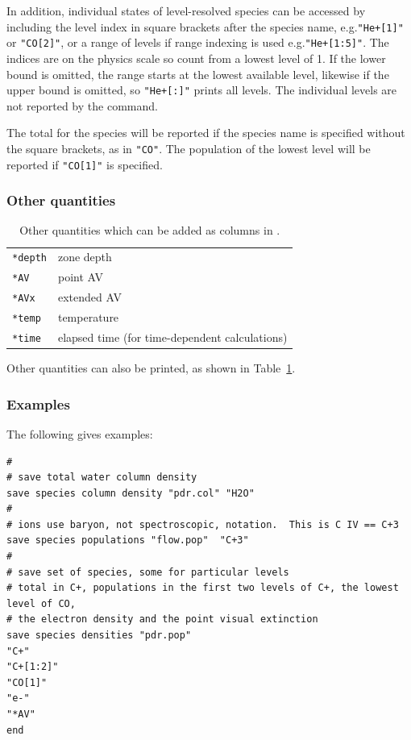 In addition, individual states of level-resolved species can be
accessed by including the level index in square brackets after the
species name, e.g.\@ \verb|"He+[1]"| or \verb|"CO[2]"|, or a range of
levels if range indexing is used e.g.\@ \verb|"He+[1:5]"|.  
The indices are on the physics scale so count from a lowest level of 1.
If the
lower bound is omitted, the range starts at the lowest available
level, likewise if the upper bound is omitted, so \verb|"He+[:]"|
prints all levels.  The individual levels are not reported by the
 command.
  
The total for the species will be reported if the species name is specified
without the square brackets, as in \verb|"CO"|.  The population of the
lowest level will be reported if  \verb|"CO[1]"| is specified.

\subsubsection{Other quantities}
\begin{table}
\caption{Other quantities which can be added as columns in \protect{}.}
\begin{center}
\begin{tabular}{ll}
\verb|*depth| & zone depth \\
\verb|*AV| & point AV \\
\verb|*AVx| & extended AV \\
\verb|*temp| & temperature \\
\verb|*time| & elapsed time (for time-dependent calculations)
\end{tabular}
\end{center}
\label{tab:othersaves}
\end{table}
Other quantities can also be printed, as shown in Table~\ref{tab:othersaves}.

\subsubsection{Examples}

The following gives examples:
\begin{verbatim}
#
# save total water column density
save species column density "pdr.col" "H2O"
#
# ions use baryon, not spectroscopic, notation.  This is C IV == C+3
save species populations "flow.pop"  "C+3"
#
# save set of species, some for particular levels
# total in C+, populations in the first two levels of C+, the lowest level of CO,
# the electron density and the point visual extinction
save species densities "pdr.pop"
"C+"
"C+[1:2]"
"CO[1]"
"e-"
"*AV"
end
\end{verbatim}

